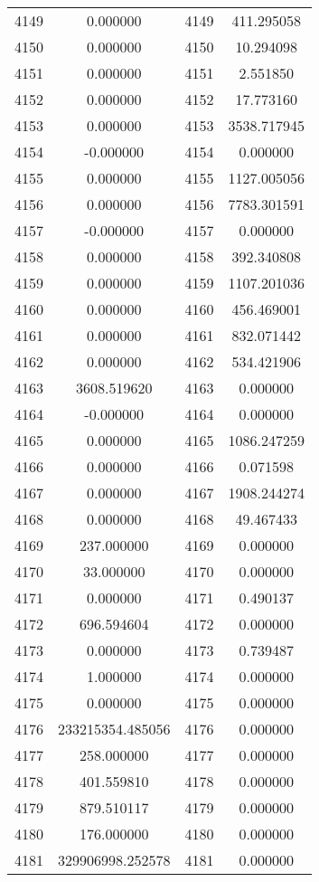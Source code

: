 \documentclass[12pt]{article}
\begin{document}
\begin{longtable}{@{}cccc@{}}
4149 & 0.000000 & 4149 & 411.295058 \\
4150 & 0.000000 & 4150 & 10.294098 \\
4151 & 0.000000 & 4151 & 2.551850 \\
4152 & 0.000000 & 4152 & 17.773160 \\
4153 & 0.000000 & 4153 & 3538.717945 \\
4154 & -0.000000 & 4154 & 0.000000 \\
4155 & 0.000000 & 4155 & 1127.005056 \\
4156 & 0.000000 & 4156 & 7783.301591 \\
4157 & -0.000000 & 4157 & 0.000000 \\
4158 & 0.000000 & 4158 & 392.340808 \\
4159 & 0.000000 & 4159 & 1107.201036 \\
4160 & 0.000000 & 4160 & 456.469001 \\
4161 & 0.000000 & 4161 & 832.071442 \\
4162 & 0.000000 & 4162 & 534.421906 \\
4163 & 3608.519620 & 4163 & 0.000000 \\
4164 & -0.000000 & 4164 & 0.000000 \\
4165 & 0.000000 & 4165 & 1086.247259 \\
4166 & 0.000000 & 4166 & 0.071598 \\
4167 & 0.000000 & 4167 & 1908.244274 \\
4168 & 0.000000 & 4168 & 49.467433 \\
4169 & 237.000000 & 4169 & 0.000000 \\
4170 & 33.000000 & 4170 & 0.000000 \\
4171 & 0.000000 & 4171 & 0.490137 \\
4172 & 696.594604 & 4172 & 0.000000 \\
4173 & 0.000000 & 4173 & 0.739487 \\
4174 & 1.000000 & 4174 & 0.000000 \\
4175 & 0.000000 & 4175 & 0.000000 \\
4176 & 233215354.485056 & 4176 & 0.000000 \\
4177 & 258.000000 & 4177 & 0.000000 \\
4178 & 401.559810 & 4178 & 0.000000 \\
4179 & 879.510117 & 4179 & 0.000000 \\
4180 & 176.000000 & 4180 & 0.000000 \\
4181 & 329906998.252578 & 4181 & 0.000000 \\

\end{longtable}
\end{document}
